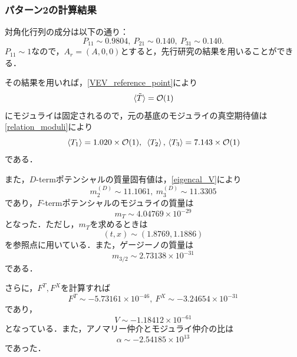 \documentclass[a4paper,uplatex,dvipdfmx]{jsarticle}
\theoremstyle{definition}
\begin{document}
\subsubsection*{パターン2の計算結果}

対角化行列の成分は以下の通り：
\begin{equation}
   P_{11}\sim 0.9804
   ,\ 
   P_{21}\sim 0.140
   ,\ 
   P_{31}\sim 0.140
   .
   \nonumber
\end{equation}
$P_{11}\sim 1$なので，$A_{r}=(A,0,0)$とすると，先行研究の結果を用いることができる．

その結果を用いれば，\eqref{VEV_reference_point}により
\begin{equation}
   \ev*{\tilde{T}}
   =
   \mathcal{O}(1)
   \nonumber
\end{equation}
にモジュライは固定されるので，元の基底のモジュライの真空期待値は\eqref{relation_moduli}により
\begin{equation}
   \ev*{T_{1}}
   =
   1.020
   \times
   \mathcal{O}(1)
   ,\ 
   \ev*{T_{2}},\ev*{T_{3}}
   =
   7.143
   \times
   \mathcal{O}(1)
   \nonumber
\end{equation}
である．

また，$D$-termポテンシャルの質量固有値は，\eqref{eigencal_V}により
\begin{equation}
   m_{2}^{(D)}
   \sim
   11.1061
   ,\ 
   m_{3}^{(D)}
   \sim
   11.3305
   \nonumber
\end{equation}
であり，$F$-termポテンシャルのモジュライの質量は
\begin{equation}
   m_{T}
   \sim
   4.04769
   \times
   10^{-29}
   \nonumber
\end{equation}
となった．ただし，$m_{T}$を求めるときは
\begin{equation}
   (t,x)
   \sim
   (1.8769,1.1886)
   \nonumber
\end{equation}
を参照点に用いている．また，ゲージーノの質量は
\begin{equation}
   m_{3/2}
   \sim
   2.73138\times10^{-31}
   \nonumber
\end{equation}
である．

さらに，$F^{T},F^{X}$を計算すれば
\begin{equation}
   F^{T}
   \sim
   -5.73161
   \times
   10^{-46}
   ,\ 
   F^{X}
   \sim
   -3.24654\times10^{-31}
   \nonumber
\end{equation}
であり，
\begin{equation}
   V
   \sim
   -1.18412\times10^{-61}
   \nonumber
\end{equation}
となっている．また，アノマリー仲介とモジュライ仲介の比は
\begin{equation}
   \alpha
   \sim
   -2.54185\times10^{13}
   \nonumber
\end{equation}
であった．
\end{document}
